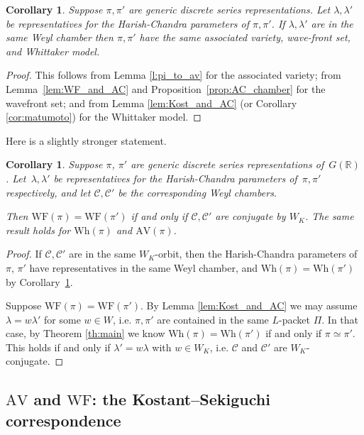 \documentclass[cupthm]{CUP-JNL-JMJ}
\numberwithin{equation}{section}
\theoremstyle{cupplain}
\newtheorem{corollary}[theorem]{Corollary}
\theoremstyle{cupdefinition}
\theoremstyle{cupremark}
\theoremstyle{cupproof}
\newtheorem{proof}{Proof}
\newcommand{\R}{\mathbb R}
\newcommand{\AV}{\mathrm{AV}}
\newcommand{\Wh}{\mathrm{Wh}}
\newcommand{\WF}{\mathrm{WF}}
\begin{document}
\begin{corollary}
\label{c:same}
Suppose $\pi,\pi'$ are generic discrete series representations. Let  $\lambda,\lambda'$ be representatives
for the Harish-Chandra parameters of $\pi,\pi'$. If 
$\lambda,\lambda'$ are in the same  Weyl chamber then
$\pi,\pi'$ have the same associated variety, wave-front set, and Whittaker model.
\end{corollary}

\begin{proof}
This follows from Lemma \ref{l:pi_to_av} for the associated variety;
from Lemma~\ref{lem:WF_and_AC} and Proposition~\ref{prop:AC_chamber} for the wavefront set; and from Lemma \ref{lem:Kost_and_AC} (or Corollary \ref{cor:matumoto})
for the Whittaker model.
\end{proof}

Here is a slightly stronger statement.

\begin{corollary}
\label{l:equalWhittaker}
Suppose $\pi$, $\pi'$ are generic discrete series representations of~$G(\R)$. Let~$\lambda, \lambda'$ be representatives for the Harish-Chandra parameters of~$\pi, \pi'$ respectively, and let $\mathscr{C}, \mathscr{C}'$ be the corresponding Weyl chambers. 

Then $\WF(\pi)=\WF(\pi')$ if and only if $\mathscr{C}, \mathscr{C}'$ are conjugate by $W_K$.
The same result holds for $\Wh(\pi)$ and $\AV(\pi)$. 
\end{corollary}

\begin{proof}
If  $\mathscr{C}, \mathscr{C}'$ are in the same $W_K$-orbit, then the Harish-Chandra parameters of $\pi$, $\pi'$ have representatives in the same Weyl chamber, and $\Wh(\pi)=\Wh(\pi')$ by Corollary~\ref{c:same}.

Suppose $\WF(\pi)=\WF(\pi')$. By Lemma \ref{lem:Kost_and_AC} we may assume
$\lambda=w\lambda'$ for some $w\in W$, i.e. $\pi,\pi'$ are contained
in the same $L$-packet $\Pi$. In that case, by Theorem \ref{th:main} 
we know $\Wh(\pi)=\Wh(\pi')$ if and only if $\pi\simeq \pi'$.
This holds if and only if $\lambda'=w\lambda$ with $w\in W_K$, 
i.e. $\mathscr{C}$ and $\mathscr{C}'$ are $W_K$-conjugate.
\end{proof}


\subsection{$\AV$ and $\WF$: the Kostant--Sekiguchi correspondence } \label{sec:Sekiguchi}
\end{document}
